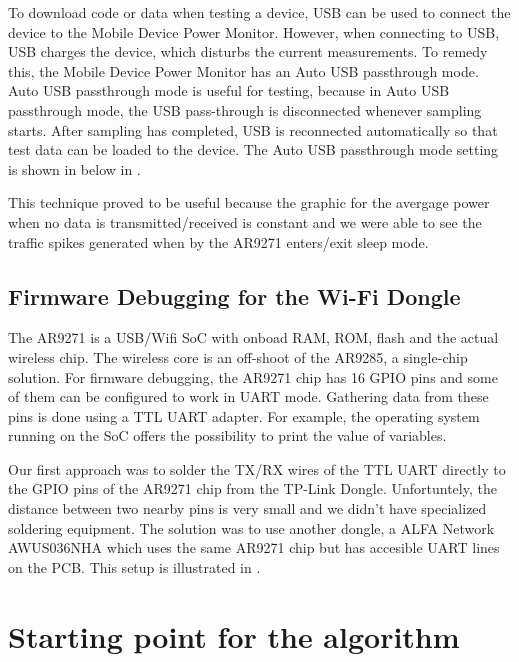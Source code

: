 To download code or data when testing a device, USB can be used to connect the device to
the Mobile Device Power Monitor. However, when connecting to USB, USB charges the
device, which disturbs the current measurements. To remedy this, the Mobile Device Power
Monitor has an Auto USB passthrough mode. Auto USB passthrough mode is useful
for testing, because in Auto USB passthrough mode, the USB pass-through is
disconnected whenever sampling starts. After sampling has completed, USB is reconnected
automatically so that test data can be loaded to the device. The Auto USB passthrough
mode setting is shown in below in .

This technique proved to be useful because the graphic for the avergage power when no data is transmitted/received is constant and we were able to see the traffic spikes generated when by the AR9271 enters/exit sleep mode.


\subsection{Firmware Debugging for the Wi-Fi Dongle}
\label{sec:firmwaredebugging}

The AR9271 is a USB/Wifi SoC with onboad RAM, ROM, flash and the actual wireless chip.  The wireless core is an off-shoot of the AR9285, a single-chip solution. For firmware debugging, the AR9271 chip has 16 GPIO pins and some of them can be configured to work in UART mode.  Gathering data from these pins is done using a TTL UART adapter. For example, the operating system running on the SoC offers the possibility to print the value of variables.

Our first approach was to solder the TX/RX wires of the TTL UART directly to the GPIO pins of the AR9271 chip from the TP-Link Dongle. Unfortuntely, the distance between two nearby pins is very small and we didn't have specialized soldering equipment. The solution was to use another dongle, a ALFA Network AWUS036NHA which uses the same AR9271 chip but has accesible UART lines on the PCB. This setup is illustrated in .


\section{Starting point for the algorithm}
\label{sec:fix}

